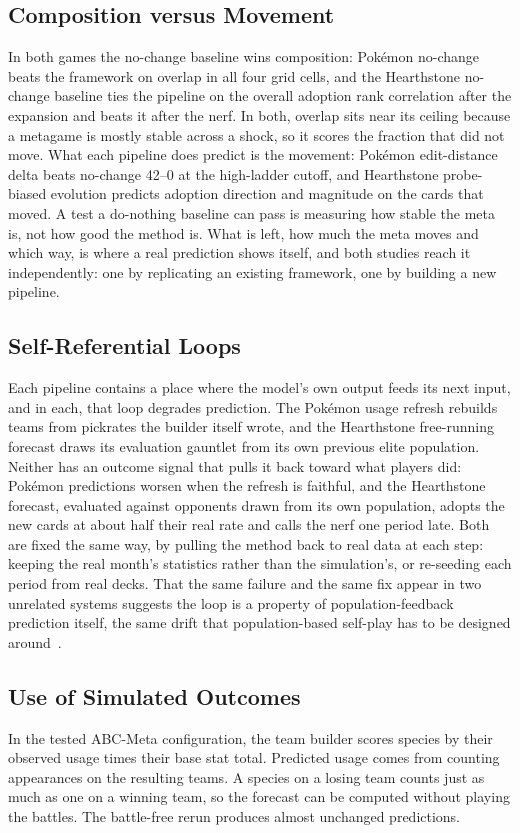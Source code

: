 \documentclass[journal]{IEEEtran}
\newcommand{\pkmn}{Pok\'emon}
\begin{document}
\subsection{Composition versus Movement}
In both games the no-change baseline wins composition: \pkmn{} no-change
beats the framework on overlap in all four grid cells, and the
Hearthstone no-change baseline ties the pipeline on the overall adoption
rank correlation after the expansion and beats it after the nerf. In both, overlap sits near its ceiling because a metagame is
mostly stable across a shock, so it scores the fraction that did not move.
What each pipeline does predict is the movement: \pkmn{} edit-distance
delta beats no-change 42--0 at the high-ladder cutoff, and
Hearthstone probe-biased evolution predicts adoption direction and
magnitude on the cards that moved. A test a
do-nothing baseline can pass is measuring how stable the meta is, not how
good the method is. What is left, how much the meta moves and which way, is
where a real prediction shows itself, and both studies reach it
independently: one by replicating an existing framework, one by building a
new pipeline.

\subsection{Self-Referential Loops}
Each pipeline contains a place where the model's own output feeds its next
input, and in each, that loop degrades prediction. The \pkmn{} usage
refresh rebuilds teams from pickrates the builder itself wrote, and the
Hearthstone free-running forecast draws its evaluation gauntlet
from its own previous elite population. Neither has an outcome signal
that pulls it back toward what players did: \pkmn{} predictions worsen
when the refresh is faithful, and the Hearthstone forecast, evaluated
against opponents drawn from its own population, adopts the new cards at
about half their real rate and calls the nerf one period late. Both are
fixed the same way, by pulling the method back to real data at each step:
keeping the real month's statistics rather than the simulation's, or
re-seeding each period from real decks. That the same failure and the same fix appear in two
unrelated systems suggests the loop is a property of population-feedback
prediction itself, the same drift that population-based self-play has to
be designed around~\cite{lanctot2017unified,balduzzi2019openended}.

\subsection{Use of Simulated Outcomes}
In the tested ABC-Meta configuration, the team builder scores species by
their observed usage times their base stat total. Predicted usage comes
from counting appearances on the resulting teams. A species on a losing
team counts just as much as one on a winning team, so the forecast can be
computed without playing the battles. The battle-free rerun produces
almost unchanged predictions.
\end{document}

